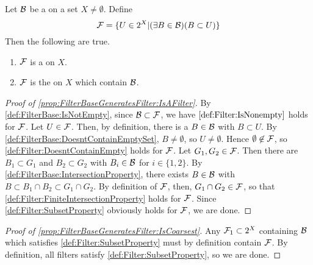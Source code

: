 \begin{prop}
    \label{prop:FilterBaseGeneratesFilter}
    Let $\mathcal{B}$ be a \FilterBase on a 
    set $X \neq \emptyset$. 
    Define 
    \begin{equation*}
    \mathcal{F}=\{U \in 2^{X} | (\exists B \in \mathcal{B})(B \subset U) \}
    \end{equation*}
    Then the following are true. 
    \begin{enumerate}[label=(\roman*), ref={\ref{prop:FilterBaseGeneratesFilter}.~\roman*}]
        \item \label{prop:FilterBaseGeneratesFilter:IsAFilter} $\mathcal{F}$ is a \Filter on $X$. 
        \item \label{prop:FilterBaseGeneratesFilter:IsCoarsest} $\mathcal{F}$ is the \CoarsestFilter \Filter on $X$ which contain $\mathcal{B}$. 
    \end{enumerate}
    \begin{proof}[Proof of \ref{prop:FilterBaseGeneratesFilter:IsAFilter}]
        By \ref{def:FilterBase:IsNotEmpty}, since $\mathcal{B} \subset \mathcal{F}$, we have $\ref{def:Filter:IsNonempty}$ holds for $\mathcal{F}$. 
        Let $U \in \mathcal{F}$. 
        Then, by definition, there is a $B \in \mathcal{B}$ with $B \subset U$. 
            By \ref{def:FilterBase:DoesntContainEmptySet}, $B \neq \emptyset$, so $U \neq \emptyset$. 
            Hence $\emptyset \not \in \mathcal{F}$, so 
            \ref{def:Filter:DoesntContainEmpty} holds for $\mathcal{F}$. 
        Let $G_1,G_2 \in \mathcal{F}$. Then there are 
        $B_1 \subset G_1$ and $B_2 \subset G_2$ with $B_i \in \mathcal{B}$ for $i \in \{1,2\}$. 
        By \ref{def:FilterBase:IntersectionProperty}, there exists 
        $B \in \mathcal{B}$ with $B \subset B_1 \cap B_2 \subset G_1 \cap G_2$. 
        By definition of $\mathcal{F}$, then, $G_1 \cap G_2 \in \mathcal{F}$, so that 
        \ref{def:Filter:FiniteIntersectionProperty}
        holds for $\mathcal{F}$. 
        Since \ref{def:Filter:SubsetProperty} obviously holds for 
        $\mathcal{F}$, we are done. 
    \end{proof}
    \begin{proof}[Proof of \ref{prop:FilterBaseGeneratesFilter:IsCoarsest}]
        Any $\mathcal{F}_1 \subset 2^X$ containing $\mathcal{B}$ which satisfies
        \ref{def:Filter:SubsetProperty} must by definition contain 
        $\mathcal{F}$. By definition, all filters satisfy 
        \ref{def:Filter:SubsetProperty}, so we are done. 
    \end{proof}
\end{prop}
